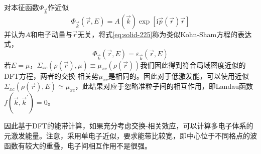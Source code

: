 对本征函数$\Phi_{\vec k}$作近似
$$\Phi_{\vec k}(\vec r,E)=A(\vec k)\exp[\mathrm{i}\vec p(\vec r)\vec r]$$
并认为$A$和电子动量与$\vec r$无关，将式\eqref{eq:solid-225}称为类似Kohn-Sham方程的表达式\cite{JPC4-2064_1971}，
\begin{equation}
  [-\dfrac12\nabla^2+V_C(\vec r)+\Sigma_{xc}(\rho(\vec r),E)]\Phi_{\vec k}(\vec r,E)=\varepsilon_{\vec k}(\vec r,E)
  \label{eq:solid-228}
\end{equation}
若$E=\mu$，$\Sigma_{xc}(\rho(\vec r),\mu)\equiv\mu_{xc}(\rho(\vec r))$我们因此得到符合局域密度近似的DFT方程，两者的交换-相关势$\mu_{xc}$是相同的。因此对于低激发能，可以使用近似$\Sigma_{xc}(\rho(\vec r),E)\simeq\mu_{xc}$，此结果对应于忽略准粒子间的相互作用，即Landau函数$f(\vec k,\vec k^{\prime})=0$。

因此基于DFT的能带计算，如果充分考虑交换-相关效应，可以计算多电子体系的元激发能量。注意，采用单电子近似，要求能带比较宽，即中心位于不同格点的波函数有较大的重叠，电子间相互作用不是很强。

